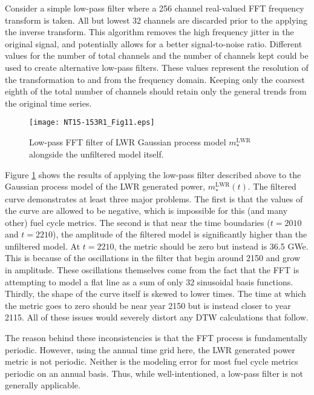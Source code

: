 \documentclass{ntmanuscript}
\newcommand{\LWR}{\mathrm{LWR}}
\begin{document}
Consider a simple low-pass filter where a 256 channel real-valued FFT frequency
transform is taken.  All but lowest 32 channels are discarded prior to the applying
the inverse transform. This algorithm removes the
high frequency jitter in the original signal, and
potentially allows for a better signal-to-noise ratio. Different values
for the number of total channels and the number of channels kept could be
used to create alternative low-pass filters. These values represent the
resolution of the transformation to and from the frequency domain. Keeping
only the coarsest eighth of the total number of channels should retain only
the general trends from the original time series.

\begin{figure}[htb]
\centering
\texttt{[image: NT15-153R1\_Fig11.eps]}
\caption{Low-pass FFT filter of LWR Gaussian process model $m_*^\LWR$ alongside
the unfiltered model itself.}
\label{fft-lwr-model}
\end{figure}

Figure \ref{fft-lwr-model} shows the results of applying the low-pass filter
described above to the Gaussian process model of the LWR generated power,
$m_*^\LWR(t)$.  The filtered curve demonstrates at least three major problems.  The
first is that the values of the curve are allowed to be negative, which is
impossible for this (and many other) fuel cycle metrics.  The second is that
near the time boundaries ($t=2010$ and $t=2210$), the amplitude of the filtered model
is significantly higher than the unfiltered model. At $t=2210$, the metric
should be zero but
instead is 36.5 GWe. This is because of the oscillations in the filter that
begin around 2150 and grow in amplitude. These oscillations themselves
come from the fact that the FFT is attempting to model a flat line as a sum
of only 32 sinusoidal basis functions.
Thirdly, the shape of the curve itself is skewed to lower
times. The time at which the metric goes to zero should be near year 2150 but is
instead closer to year 2115.  All of these issues would severely distort any
DTW calculations that follow.

The reason behind these inconsistencies is that the FFT process is fundamentally
periodic.  However, using the annual time grid here, the LWR generated power metric
is not periodic. Neither is the modeling error for most fuel cycle metrics periodic
on an annual basis.
Thus, while well-intentioned, a low-pass filter is not generally applicable.
\end{document}
